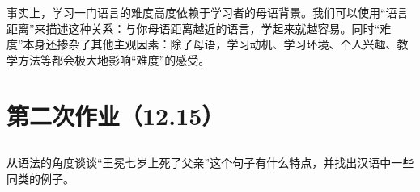 \documentclass[10pt]{ctexart}
\begin{document}
事实上，学习一门语言的难度高度依赖于学习者的母语背景。我们可以使用``语言距离''来描述这种关系：与你母语距离越近的语言，学起来就越容易。同时``难度''本身还掺杂了其他主观因素：除了母语，学习动机、学习环境、个人兴趣、教学方法等都会极大地影响``难度''的感受。

\newpage

\section{第二次作业（12.15）}
\subsection{}
{\heiti
从语法的角度谈谈``王冕七岁上死了父亲''这个句子有什么特点，并找出汉语中一些同类的例子。}

\vspace{0.5cm}
\end{document}

